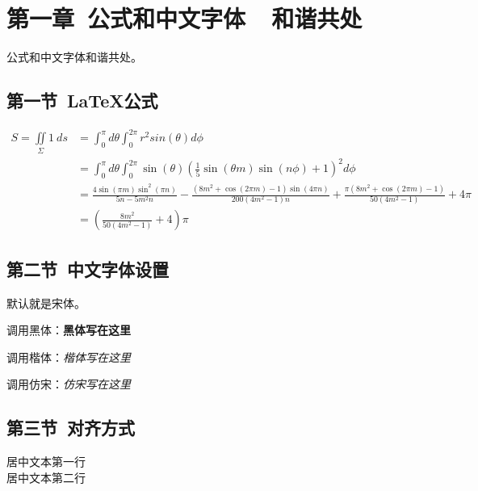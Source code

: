 \documentclass{ctexart}
\begin{document}
\setcounter{page}{1} 


\section{第一章\ 公式和中文字体\ \ 和谐共处}

公式和中文字体和谐共处。\\

\subsection{第一节\ LaTeX公式}

\begin{align*}
S=\iint\limits_{\Sigma}1 \ ds &= \int_0^{\pi}d\theta \int_0^{2\pi} r^2sin(\theta) d\phi \\
&= \int_0^{\pi}d\theta \int_0^{2\pi}\sin (\theta ) \left(\frac{1}{5} \sin (\theta  m) \sin (n \phi )+1\right)^2d\phi\\
&=\frac{4 \sin (\pi  m) \sin ^2(\pi  n)}{5 n-5 m^2 n}-\frac{\left(8 m^2+\cos (2 \pi  m)-1\right) \sin (4 \pi  n)}{200 \left(4 m^2-1\right) n}+\frac{\pi  \left(8 m^2+\cos (2 \pi  m)-1\right)}{50 \left(4 m^2-1\right)}+4 \pi\\
&=  \left(\frac{8 m^2}{50 \left(4 m^2-1\right)}+4\right)\pi
\end{align*}

\subsection{第二节\ 中文字体设置}

默认就是宋体。\par
调用黑体：\textbf{黑体写在这里}\par
调用楷体：\textit{楷体写在这里}\par
调用仿宋：\textsl{仿宋写在这里}\par

\subsection{第三节\ 对齐方式}


\begin{center} 
居中文本第一行\\
居中文本第二行\\
\end{center}
\end{document}
